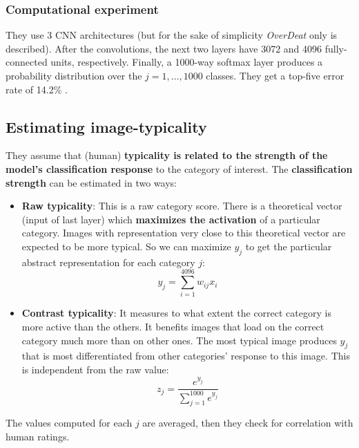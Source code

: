
\subsubsection{Computational experiment}
They use 3 CNN architectures (but for the sake of simplicity \textit{OverDeat} only is described). After the convolutions, the next two layers have 3072 and 4096 fully-connected units, respectively.
Finally, a 1000-way softmax layer produces a probability distribution over the $j = 1,\dots,1000$ classes. They get a top-five error rate of 14.2\% \notet.


\subsection{Estimating image-typicality}
They assume that (human) \textbf{typicality is related to the strength of the model’s classification response} to the category of interest.
The \textbf{classification strength} can be estimated in two ways:
\begin{itemize}
    \item \textbf{Raw typicality}: This is a raw category score. There is a theoretical vector (input of last layer) which \textbf{maximizes the activation} of a particular category. Images with representation very close to this theoretical vector are expected to be more typical. So we can maximize $y_j$ to get the particular abstract representation for each category $j$:
    \[
    y_j = \sum_{i=1}^{4096} w_{ij}x_i
    \]
    \item \textbf{Contrast typicality}: It measures to what extent the correct category is more active than the others. It benefits images that load on the correct category much more than on other ones. The most typical image produces $y_j$ that is most differentiated from other categories’ response to this image. This is independent from the raw value:
    \[
    z_j = \frac{e^{y_j}}{ \sum_{j=1}^{1000} e^{y_j} }
    \]
\end{itemize}

The values computed for each $j$ are averaged, then they check for correlation with human ratings.

